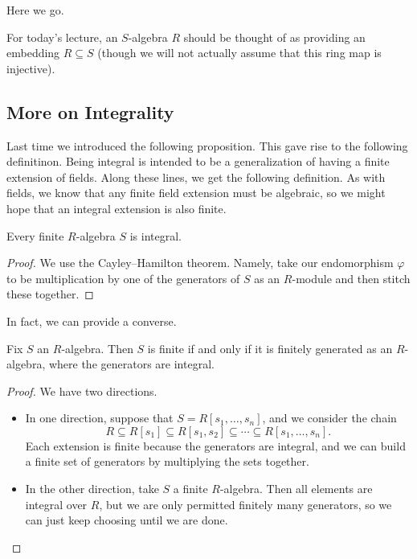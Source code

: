 
Here we go.
\begin{convention}
	For today's lecture, an $S$-algebra $R$ should be thought of as providing an embedding $R\subseteq S$ (though we will not actually assume that this ring map is injective).
\end{convention}

\subsection{More on Integrality}
Last time we introduced the following proposition.
\integralitydef*
\noindent This gave rise to the following definitinon.
\integraldefi*
\noindent Being integral is intended to be a generalization of having a finite extension of fields. Along these lines, we get the following definition.
\finitedefi*
\noindent As with fields, we know that any finite field extension must be algebraic, so we might hope that an integral extension is also finite.
\begin{lemma}
	Every finite $R$-algebra $S$ is integral.
\end{lemma}
\begin{proof}
	We use the Cayley--Hamilton theorem. Namely, take our endomorphism $\varphi$ to be multiplication by one of the generators of $S$ as an $R$-module and then stitch these together.
\end{proof}
In fact, we can provide a converse.
\begin{lemma} \label{lem:betterfinite}
	Fix $S$ an $R$-algebra. Then $S$ is finite if and only if it is finitely generated as an $R$-algebra, where the generators are integral.
\end{lemma}
\begin{proof}
	We have two directions.
	\begin{itemize}
		\item In one direction, suppose that $S=R[s_1,\ldots,s_n]$, and we consider the chain
		\[R\subseteq R[s_1]\subseteq R[s_1,s_2]\subseteq\cdots\subseteq R[s_1,\ldots,s_n].\]
		Each extension is finite because the generators are integral, and we can build a finite set of generators by multiplying the sets together.
		\item In the other direction, take $S$ a finite $R$-algebra. Then all elements are integral over $R$, but we are only permitted finitely many generators, so we can just keep choosing until we are done.
		\qedhere
	\end{itemize}
\end{proof}
